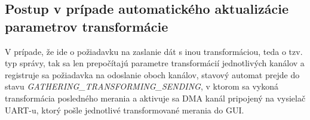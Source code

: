 \documentclass[main.tex]{subfiles}
\begin{document}
\begin{multicols*}{2}
			\subsection{Postup v prípade automatického aktualizácie parametrov transformácie}
			 V prípade, že ide o požiadavku na zaslanie dát s inou transformáciou, teda o tzv.  typ správy, tak sa len prepočítajú parametre transformácií jednotlivých kanálov a registruje sa požiadavka na odoslanie oboch kanálov, stavový automat prejde do stavu \textit{GATHERING\_TRANSFORMING\_SENDING}, v ktorom sa vykoná transformácia posledného merania a aktivuje sa DMA kanál pripojený na vysielač UART-u, ktorý pošle jednotlivé transformované merania do GUI.
			 
			 
		\end{multicols*}
\end{document}
